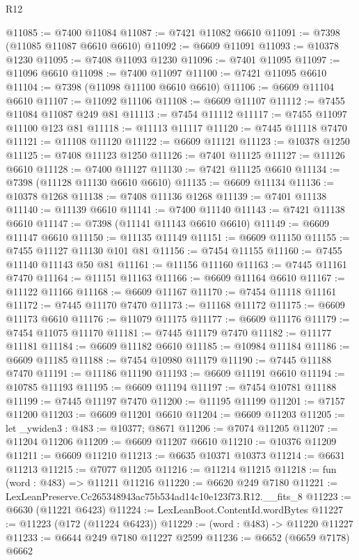 \begin{lexlean}{R12}
\begin{coremodule}
@11085 := @7400 @11084
@11087 := @7421 @11082 @6610
@11091 := @7398 (@11085 @11087 @6610 @6610)
@11092 := @6609 @11091
@11093 := @10378 @1230
@11095 := @7408 @11093 @1230
@11096 := @7401 @11095
@11097 := @11096 @6610
@11098 := @7400 @11097
@11100 := @7421 @11095 @6610
@11104 := @7398 (@11098 @11100 @6610 @6610)
@11106 := @6609 @11104 @6610
@11107 := @11092 @11106
@11108 := @6609 @11107
@11112 := @7455 @11084 @11087 @249 @81
@11113 := @7454 @11112
@11117 := @7455 @11097 @11100 @123 @81
@11118 := @11113 @11117
@11120 := @7445 @11118 @7470
@11121 := @11108 @11120
@11122 := @6609 @11121
@11123 := @10378 @1250
@11125 := @7408 @11123 @1250
@11126 := @7401 @11125
@11127 := @11126 @6610
@11128 := @7400 @11127
@11130 := @7421 @11125 @6610
@11134 := @7398 (@11128 @11130 @6610 @6610)
@11135 := @6609 @11134
@11136 := @10378 @1268
@11138 := @7408 @11136 @1268
@11139 := @7401 @11138
@11140 := @11139 @6610
@11141 := @7400 @11140
@11143 := @7421 @11138 @6610
@11147 := @7398 (@11141 @11143 @6610 @6610)
@11149 := @6609 @11147 @6610
@11150 := @11135 @11149
@11151 := @6609 @11150
@11155 := @7455 @11127 @11130 @101 @81
@11156 := @7454 @11155
@11160 := @7455 @11140 @11143 @50 @81
@11161 := @11156 @11160
@11163 := @7445 @11161 @7470
@11164 := @11151 @11163
@11166 := @6609 @11164 @6610
@11167 := @11122 @11166
@11168 := @6609 @11167
@11170 := @7454 @11118 @11161
@11172 := @7445 @11170 @7470
@11173 := @11168 @11172
@11175 := @6609 @11173 @6610
@11176 := @11079 @11175
@11177 := @6609 @11176
@11179 := @7454 @11075 @11170
@11181 := @7445 @11179 @7470
@11182 := @11177 @11181
@11184 := @6609 @11182 @6610
@11185 := @10984 @11184
@11186 := @6609 @11185
@11188 := @7454 @10980 @11179
@11190 := @7445 @11188 @7470
@11191 := @11186 @11190
@11193 := @6609 @11191 @6610
@11194 := @10785 @11193
@11195 := @6609 @11194
@11197 := @7454 @10781 @11188
@11199 := @7445 @11197 @7470
@11200 := @11195 @11199
@11201 := @7157 @11200
@11203 := @6609 @11201 @6610
@11204 := @6609 @11203
@11205 := let _ywiden3 : @483 := @10377; @8671
@11206 := @7074 @11205
@11207 := @11204 @11206
@11209 := @6609 @11207 @6610
@11210 := @10376 @11209
@11211 := @6609 @11210
@11213 := @6635 @10371 @10373
@11214 := @6631 @11213
@11215 := @7077 @11205
@11216 := @11214 @11215
@11218 := fun (word : @483) => @11211 @11216
@11220 := @6620 @249 @7180
@11221 := LexLeanPreserve.Cc265348943ac75b534ad14c10e123f73.R12.__fits_8
@11223 := @6630 (@11221 @6423)
@11224 := LexLeanBoot.ContentId.wordBytes
@11227 := @11223 (@172 (@11224 @6423))
@11229 := (word : @483) -> @11220 @11227
@11233 := @6644 @249 @7180 @11227 @2599
@11236 := @6652 (@6659 @7178) @6662

\end{coremodule}
\end{lexlean}
